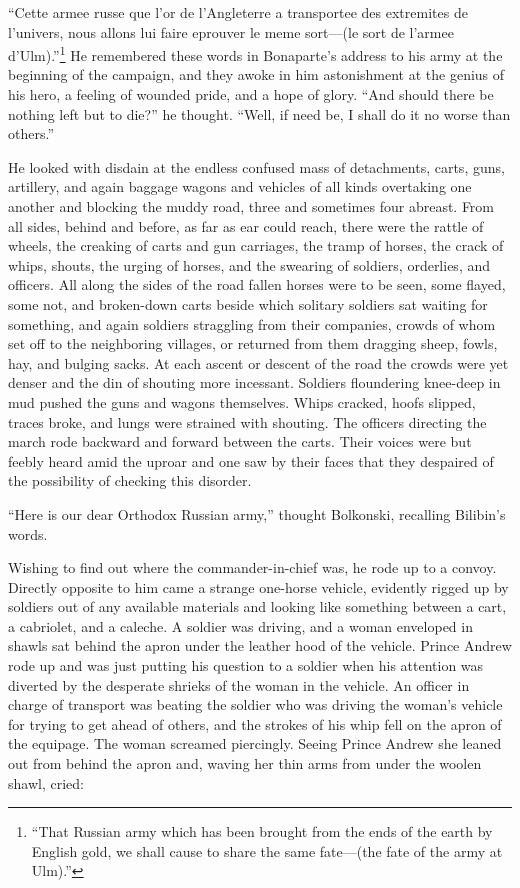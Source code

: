 ``Cette armee russe que l'or de l'Angleterre a transportee des
extremites de l'univers, nous allons lui faire eprouver le meme
sort---(le sort de l'armee d'Ulm).''\footnote{ ``That Russian
army which has been brought from the ends of the earth by English
gold, we shall cause to share the same fate---(the fate of the
army at Ulm).''} He remembered these words in Bonaparte's address
to his army at the beginning of the campaign, and they awoke in
him astonishment at the genius of his hero, a feeling of wounded
pride, and a hope of glory. ``And should there be nothing left
but to die?'' he thought. ``Well, if need be, I shall do it no
worse than others.''

He looked with disdain at the endless confused mass of
detachments, carts, guns, artillery, and again baggage wagons and
vehicles of all kinds overtaking one another and blocking the
muddy road, three and sometimes four abreast. From all sides,
behind and before, as far as ear could reach, there were the
rattle of wheels, the creaking of carts and gun carriages, the
tramp of horses, the crack of whips, shouts, the urging of
horses, and the swearing of soldiers, orderlies, and officers.
All along the sides of the road fallen horses were to be seen,
some flayed, some not, and broken-down carts beside which
solitary soldiers sat waiting for something, and again soldiers
straggling from their companies, crowds of whom set off to the
neighboring villages, or returned from them dragging sheep,
fowls, hay, and bulging sacks. At each ascent or descent of the
road the crowds were yet denser and the din of shouting more
incessant. Soldiers floundering knee-deep in mud pushed the guns
and wagons themselves. Whips cracked, hoofs slipped, traces
broke, and lungs were strained with shouting. The officers
directing the march rode backward and forward between the
carts. Their voices were but feebly heard amid the uproar and one
saw by their faces that they despaired of the possibility of
checking this disorder.

``Here is our dear Orthodox Russian army,'' thought Bolkonski,
recalling Bilibin's words.

Wishing to find out where the commander-in-chief was, he rode up
to a convoy. Directly opposite to him came a strange one-horse
vehicle, evidently rigged up by soldiers out of any available
materials and looking like something between a cart, a cabriolet,
and a caleche. A soldier was driving, and a woman enveloped in
shawls sat behind the apron under the leather hood of the
vehicle. Prince Andrew rode up and was just putting his question
to a soldier when his attention was diverted by the desperate
shrieks of the woman in the vehicle. An officer in charge of
transport was beating the soldier who was driving the woman's
vehicle for trying to get ahead of others, and the strokes of his
whip fell on the apron of the equipage. The woman screamed
piercingly. Seeing Prince Andrew she leaned out from behind the
apron and, waving her thin arms from under the woolen shawl,
cried:

